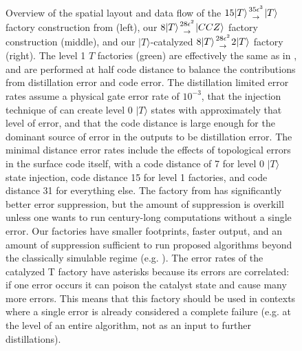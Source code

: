 \documentclass[twocolumn,accepted=2019-03-30]{quantumarticle}
\newcommand{\factory}[3]{$#1 \genfrac{}{}{0pt}{}{#2}{\rightarrow} {#3}$ factory}
\begin{document}
\begin{figure}
  \label{fig:overview-dataflow}
  \caption{
    Overview of the spatial layout and data flow of the \factory{15|T\rangle}{35 \epsilon^3}{|T\rangle} construction from \cite{fowler2018} (left), our \factory{8|T\rangle}{28\epsilon^2}{|CCZ\rangle} construction (middle), and our $|T\rangle$-catalyzed \factory{8|T\rangle}{28\epsilon^2}{2|T\rangle} (right).
    The level 1 $T$ factories (green) are effectively the same as in \cite{fowler2018}, and are performed at half code distance to balance the contributions from distillation error and code error.
    The distillation limited error rates assume a physical gate error rate of $10^{-3}$, that the injection technique of \cite{li2015} can create level 0 $|T\rangle$ states with approximately that level of error, and that the code distance is large enough for the dominant source of error in the outputs to be distillation error.
    The minimal distance error rates include the effects of topological errors in the surface code itself, with a code distance of 7 for level 0 $|T\rangle$ state injection, code distance 15 for level 1 factories, and code distance 31 for everything else.
    The factory from \cite{fowler2018} has significantly better error suppression, but the amount of suppression is overkill unless one wants to run century-long computations without a single error.
    Our factories have smaller footprints, faster output, and an amount of suppression sufficient to run proposed algorithms beyond the classically simulable regime (e.g. \cite{babbush2018}).
    The error rates of the catalyzed T factory have asterisks because its errors are correlated: if one error occurs it can poison the catalyst state and cause many more errors.
    This means that this factory should be used in contexts where a single error is already considered a complete failure (e.g. at the level of an entire algorithm, not as an input to further distillations).
  }
\end{figure}
\end{document}
